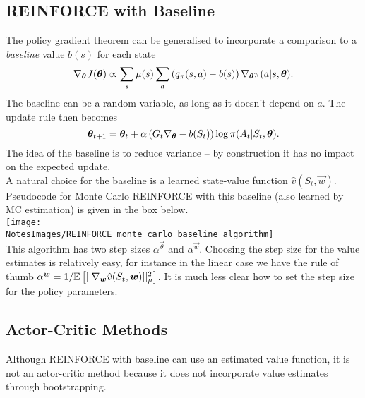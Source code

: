 \subsection{REINFORCE with Baseline}
The policy gradient theorem can be generalised to incorporate a comparison to a \emph{baseline} value $b(s)$ for each state
\begin{equation}
    \nabla_{\boldsymbol{\theta}} J(\boldsymbol{\theta}) \propto \sum_s \mu(s) \sum_a \left( q_\pi(s, a) - b(s) \right) \nabla_{\boldsymbol{\theta}} \pi(a \vert{} s, \boldsymbol{\theta}).
\end{equation}
The baseline can be a random variable, as long as it doesn't depend on $a$. The update rule then becomes
\begin{equation}
    \boldsymbol{\theta}_{t+1} = \boldsymbol{\theta}_t + \alpha \left( G_t \nabla_{\boldsymbol{\theta}} - b(S_t) \right) \log\pi(A_t\vert{} S_t, \boldsymbol{\theta}).
\end{equation}
The idea of the baseline is to reduce variance -- by construction it has no impact on the expected update.\\

A natural choice for the baseline is a learned state-value function $\hat{v}(S_t, \vec{w})$. Pseudocode for Monte Carlo REINFORCE with this baseline (also learned by MC estimation) is given in the box below.\\

\texttt{[image: \\NotesImages/REINFORCE\_monte\_carlo\_baseline\_algorithm]}\\

This algorithm has two step sizes $\alpha^{\vec{\theta}}$ and $\alpha^{\vec{w}}$. Choosing the step size for the value estimates is relatively easy, for instance in the linear case we have the rule of thumb $\alpha^{\boldsymbol{w}} = 1/ \mathbb{E}{}\left[ || \nabla_{\boldsymbol{w}} \hat{v}(S_t, \boldsymbol{w}) ||_\mu^2 \right]$. It is much less clear how to set the step size for the policy parameters.

\subsection{Actor-Critic Methods}
Although REINFORCE with baseline can use an estimated value function, it is not an actor-critic method because it does not incorporate value estimates through bootstrapping.\\

